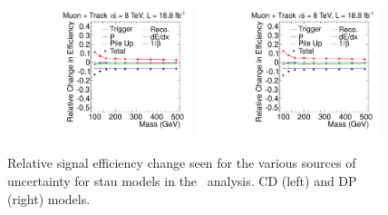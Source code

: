 \begin{figure}[ht]
\centering
  \includegraphics[clip=false, trim=0.0cm 0cm 0.0cm 0cm, width=0.48\textwidth]{figures/tkmu/MuGMStauUncertainty}
  \includegraphics[clip=false, trim=0.0cm 0cm 0.0cm 0cm, width=0.48\textwidth]{figures/tkmu/MuPPStauUncertainty} \\
\caption[Relative signal efficiency change seen for the various sources of uncertainty for stau models in the \tktof\ analysis]
{Relative signal efficiency change seen for the various sources of uncertainty for stau models in the \tktof\ analysis.
CD (left) and DP (right) models.}
    \label{fig:TkMuStauUncSource}
\end{figure}

